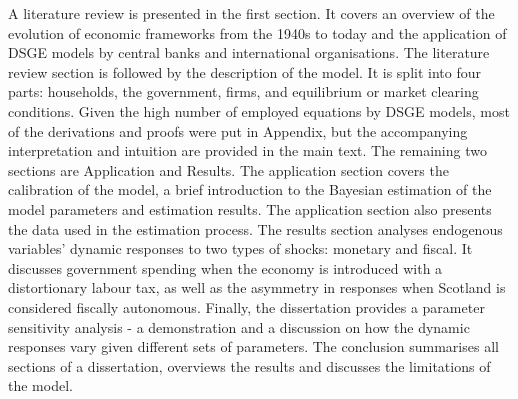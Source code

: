 A literature review is presented in the first section. It covers an overview of the evolution of economic frameworks from the 1940s to today and the application of DSGE models by central banks and international organisations. The literature review section is followed by the description of the model. It is split into four parts: households, the government, firms, and equilibrium or market clearing conditions. Given the high number of employed equations by DSGE models, most of the derivations and proofs were put in Appendix, but the accompanying interpretation and intuition are provided in the main text. The remaining two sections are Application and Results. The application section covers the calibration of the model, a brief introduction to the Bayesian estimation of the model parameters and estimation results. The application section also presents the data used in the estimation process. The results section analyses endogenous variables' dynamic responses to two types of shocks: monetary and fiscal. It discusses government spending when the economy is introduced with a distortionary labour tax, as well as the asymmetry in responses when Scotland is considered fiscally autonomous. Finally, the dissertation provides a parameter sensitivity analysis - a demonstration and a discussion on how the dynamic responses vary given different sets of parameters. The conclusion summarises all sections of a dissertation, overviews the results and discusses the limitations of the model.